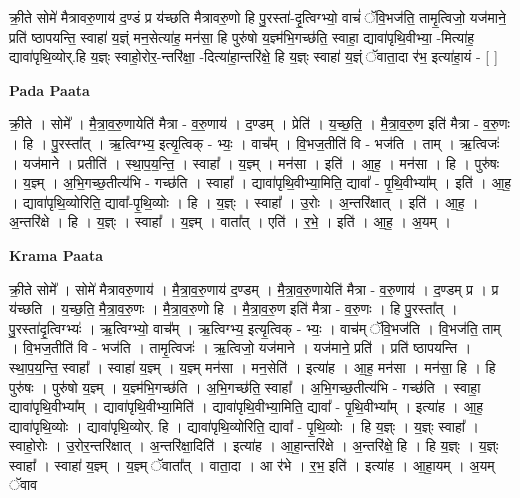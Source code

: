 \documentclass[17pt]{extarticle}
\begin{document}
क्री॒ते सोमे॑ मैत्रावरु॒णाय॑ द॒ण्डं प्र य॑च्छति मैत्रावरु॒णो हि पु॒रस्ता॑-दृ॒त्विग्भ्यो॒ वाचं॑ ॅवि॒भज॑ति॒ तामृ॒त्विजो॒ यज॑माने॒ प्रति॑ ष्ठापयन्ति॒ स्वाहा॑ य॒ज्ञ्ं मन॒सेत्या॑ह॒ मन॑सा॒ हि पुरु॑षो य॒ज्ञ्म॑भि॒गच्छ॑ति॒ स्वाहा॒ द्यावा॑पृथि॒वीभ्या॒ -मित्या॑ह॒ द्यावा॑पृथि॒व्योर्.हि य॒ज्ञ्ः स्वाहो॒रोर॒-न्तरि॑क्षा॒ -दित्या॑हा॒न्तरि॑क्षे॒ हि य॒ज्ञ्ः स्वाहा॑ य॒ज्ञ्ं ॅवाता॒दा र॑भ॒ इत्या॑हा॒यं - [  ] \newline

\textbf{Pada Paata} \newline

क्री॒ते । सोमे᳚ । मै॒त्रा॒व॒रु॒णायेति॑ मैत्रा - व॒रु॒णाय॑ । द॒ण्डम् । प्रेति॑ । य॒च्छ॒ति॒ । मै॒त्रा॒व॒रु॒ण इति॑ मैत्रा - व॒रु॒णः । हि । पु॒रस्ता᳚त् । ऋ॒त्विग्भ्य॒ इत्यृ॒त्विक् - भ्यः॒ । वाच᳚म् । वि॒भज॒तीति॑ वि - भज॑ति । ताम् । ऋ॒त्विजः॑ । यज॑माने । प्रतीति॑ । स्था॒प॒य॒न्ति॒ । स्वाहा᳚ । य॒ज्ञ्म् । मन॑सा । इति॑ । आ॒ह॒ । मन॑सा । हि । पुरु॑षः । य॒ज्ञ्म् । अ॒भि॒गच्छ॒तीत्य॑भि - गच्छ॑ति । स्वाहा᳚ । द्यावा॑पृथि॒वीभ्या॒मिति॒ द्यावा᳚ - पृ॒थि॒वीभ्या᳚म् । इति॑ । आ॒ह॒ । द्यावा॑पृथि॒व्योरिति॒ द्यावा᳚-पृ॒थि॒व्योः । हि । य॒ज्ञ्ः । स्वाहा᳚ । उ॒रोः । अ॒न्तरि॑क्षात् । इति॑ । आ॒ह॒ । अ॒न्तरि॑क्षे । हि । य॒ज्ञ्ः । स्वाहा᳚ । य॒ज्ञ्म् । वाता᳚त् । एति॑ । र॒भे॒ । इति॑ । आ॒ह॒ । अ॒यम् ।  \newline


\textbf{Krama Paata} \newline

क्री॒ते सोमे᳚ । सोमे॑ मैत्रावरु॒णाय॑ । मै॒त्रा॒व॒रु॒णाय॑ द॒ण्डम् । मै॒त्रा॒व॒रु॒णायेति॑ मैत्रा - व॒रु॒णाय॑ । द॒ण्डम् प्र । प्र य॑च्छति । य॒च्छ॒ति॒ मै॒त्रा॒व॒रु॒णः । मै॒त्रा॒व॒रु॒णो हि । मै॒त्रा॒व॒रु॒ण इति॑ मैत्रा - व॒रु॒णः । हि पु॒रस्ता᳚त् । पु॒रस्ता॑दृ॒त्विग्भ्यः॑ । ऋ॒त्विग्भ्यो॒ वाच᳚म् । ऋ॒त्विग्भ्य॒ इत्यृ॒त्विक् - भ्यः॒ । वाच॑म् ॅवि॒भज॑ति । वि॒भज॑ति॒ ताम् । वि॒भज॒तीति॑ वि - भज॑ति । तामृ॒त्विजः॑ । ऋ॒त्विजो॒ यज॑माने । यज॑माने॒ प्रति॑ । प्रति॑ ष्ठापयन्ति । स्था॒प॒य॒न्ति॒ स्वाहा᳚ । स्वाहा॑ य॒ज्ञ्म् । य॒ज्ञ्म् मन॑सा । मन॒सेति॑ । इत्या॑ह । आ॒ह॒ मन॑सा । मन॑सा॒ हि । हि पुरु॑षः । पुरु॑षो य॒ज्ञ्म् । य॒ज्ञ्म॑भि॒गच्छ॑ति । अ॒भि॒गच्छ॑ति॒ स्वाहा᳚ । अ॒भि॒गच्छ॒तीत्य॑भि - गच्छ॑ति । स्वाहा॒ द्यावा॑पृथि॒वीभ्या᳚म् । द्यावा॑पृथि॒वीभ्या॒मिति॑ । द्यावा॑पृथि॒वीभ्या॒मिति॒ द्यावा᳚ - पृ॒थि॒वीभ्या᳚म् । इत्या॑ह । आ॒ह॒ द्यावा॑पृथि॒व्योः । द्यावा॑पृथि॒व्योर्. हि । द्यावा॑पृथि॒व्योरिति॒ द्यावा᳚ - पृ॒थि॒व्योः । हि य॒ज्ञ्ः । य॒ज्ञ्ः स्वाहा᳚ । स्वाहो॒रोः । उ॒रोर॒न्तरि॑क्षात् । अ॒न्तरि॑क्षा॒दिति॑ । इत्या॑ह । आ॒हा॒न्तरि॑क्षे । अ॒न्तरि॑क्षे॒ हि । हि य॒ज्ञ्ः । य॒ज्ञ्ः स्वाहा᳚ । स्वाहा॑ य॒ज्ञ्म् । य॒ज्ञ्म् ॅवाता᳚त् । वाता॒दा । आ र॑भे । र॒भ॒ इति॑ । इत्या॑ह । आ॒हा॒यम् । अ॒यम् ॅवाव \newline
\end{document}
